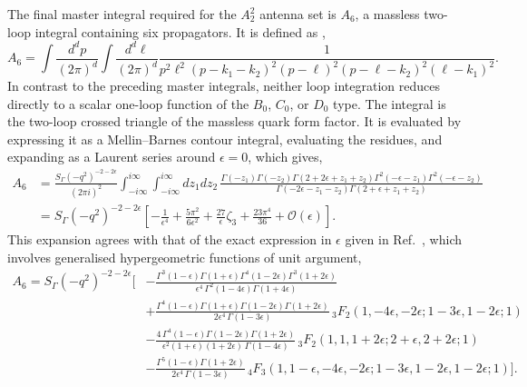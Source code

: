 The final master integral required for the $A_2^2$ antenna set is $A_6$, a massless two-loop integral
containing six propagators. It is defined as \cite{Gehrmann-DeRidder:2005btv},
\begin{equation}
    A_6 = \int\frac{d^dp}{(2\pi)^d}\int\frac{d^d\ell}{(2\pi)^d}\frac1{p^2\ell^2(p-k_1-k_2)^2(p-\ell)^2(p-\ell-k_2)^2(\ell-k_1)^2}.
\end{equation}
In contrast to the preceding master integrals, neither loop integration reduces directly to a scalar
one-loop function of the $B_0$, $C_0$, or $D_0$ type. The integral is the two-loop crossed triangle of
the massless quark form factor. It is evaluated by expressing it as a Mellin--Barnes contour integral,
evaluating the residues, and expanding as a Laurent series around $\epsilon=0$, which gives,
\begin{equation}
    \begin{split}
        A_6 &= \frac{S_\Gamma\left(-q^2\right)^{-2-2\epsilon}}{(2\pi i)^2}\int_{-i\infty}^{i\infty}\int_{-i\infty}^{i\infty}dz_1dz_2\,\frac{\Gamma(-z_1)\Gamma(-z_2)\Gamma(2+2\epsilon+z_1+z_2)\Gamma^2(-\epsilon-z_1)\Gamma^2(-\epsilon-z_2)}{\Gamma(-2\epsilon-z_1-z_2)\Gamma(2+\epsilon+z_1+z_2)}\\
            &= S_\Gamma\!\left(-q^2\right)^{-2-2\epsilon}\!\left[-\frac1{\epsilon^4}+\frac{5\pi^2}{6\epsilon^2}+\frac{27}{\epsilon}\zeta_3+\frac{23\pi^4}{36}+\mathcal O(\epsilon)\right].
    \end{split}
\end{equation}
This expansion agrees with that of the exact expression in $\epsilon$ given in
Ref.~\cite{GehrmannDeRidder0507061}, which involves generalised hypergeometric functions of unit
argument,
\begin{equation}\label{eq:A6exact}
    \begin{split}
        A_6 = S_\Gamma\!\left(-q^2\right)^{-2-2\epsilon}\Bigg[
        &-\frac{\Gamma^3(1-\epsilon)\Gamma(1+\epsilon)\Gamma^4(1-2\epsilon)\Gamma^3(1+2\epsilon)}{\epsilon^4\,\Gamma^2(1-4\epsilon)\Gamma(1+4\epsilon)}\\
        &+\frac{\Gamma^4(1-\epsilon)\Gamma(1+\epsilon)\Gamma(1-2\epsilon)\Gamma(1+2\epsilon)}{2\epsilon^4\,\Gamma(1-3\epsilon)}\,{}_3F_2\!\left(1,-4\epsilon,-2\epsilon;1-3\epsilon,1-2\epsilon;1\right)\\
        &-\frac{4\,\Gamma^4(1-\epsilon)\Gamma(1-2\epsilon)\Gamma(1+2\epsilon)}{\epsilon^2(1+\epsilon)(1+2\epsilon)\,\Gamma(1-4\epsilon)}\,{}_3F_2\!\left(1,1,1+2\epsilon;2+\epsilon,2+2\epsilon;1\right)\\
        &-\frac{\Gamma^5(1-\epsilon)\Gamma(1+2\epsilon)}{2\epsilon^4\,\Gamma(1-3\epsilon)}\,{}_4F_3\!\left(1,1-\epsilon,-4\epsilon,-2\epsilon;1-3\epsilon,1-2\epsilon,1-2\epsilon;1\right)\Bigg].
    \end{split}
\end{equation}

